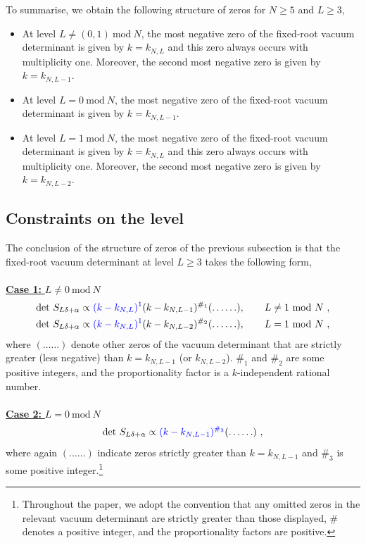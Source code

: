 To summarise, we obtain the following structure of zeros for $N \geqslant 5$ and $L \geqslant 3$, 
\begin{itemize}
    \item At level $L \neq (0,1)~\mathrm{mod}~N$, the most negative zero of the fixed-root vacuum determinant is given by $k = k_{N,L}$ and this zero always occurs with multiplicity one. Moreover, the second most negative zero is given by $k = k_{N,L-1}$. 
    \item At level $L = 0~\mathrm{mod}~N$, the most negative zero of the fixed-root vacuum determinant is given by $k = k_{N,L-1}$. 
    \item At level $L = 1~\mathrm{mod}~N$, the most negative zero of the fixed-root vacuum determinant is given by $k = k_{N,L}$ and this zero always occurs with multiplicity one. Moreover, the second most negative zero is given by $k = k_{N,L-2}$. 
\end{itemize}

\subsection{Constraints on the level}
The conclusion of the structure of zeros of the previous subsection is that the fixed-root vacuum determinant at level $L \geqslant 3$ takes the following form, \\
\\
\underline{\textbf{Case 1: } $L \neq 0~\mathrm{mod}~N$}
\begin{equation} \label{eq:typeAvacdet1}
\begin{split}
    &\mathrm{det}~S_{L\delta+\alpha} \propto \textcolor{blue}{(k-k_{N,L})^1}(k-k_{N,L-1})^{\#_1}( \ldots \ldots), \qquad L \neq 1~\mathrm{mod}~N~, \\
    &\mathrm{det}~S_{L\delta+\alpha} \propto \textcolor{blue}{(k-k_{N,L})^1}(k-k_{N,L-2})^{\#_2}( \ldots \ldots), \qquad L = 1~\mathrm{mod}~N~,
\end{split}
\end{equation}
where $( \ldots \ldots)$ denote other zeros of the vacuum determinant that are strictly greater (less negative) than $k = k_{N,L-1}$ (or $k_{N,L-2}$). $\#_1$ and $\#_2$ are some positive integers, and the proportionality factor is a $k$-independent rational number. 
\\
\\
\underline{\textbf{Case 2: } $L = 0~\mathrm{mod}~N$}
\begin{equation} \label{eq:typeAvacdet2}
    \mathrm{det}~S_{L\delta+\alpha} \propto \textcolor{blue}{(k-k_{N,L-1})^{\#_3}}( \ldots \ldots)~,
\end{equation}
where again $( \ldots \ldots)$ indicate zeros strictly greater than $k = k_{N,L-1}$ and $\#_3$ is some positive integer.\footnote{Throughout the paper, we adopt the convention that any omitted zeros in the relevant vacuum determinant are strictly greater than those displayed, $\#$ denotes a positive integer, and the proportionality factors are positive.} 

